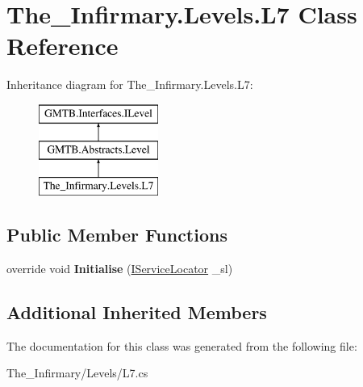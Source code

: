 \hypertarget{class_the___infirmary_1_1_levels_1_1_l7}{}\section{The\+\_\+\+Infirmary.\+Levels.\+L7 Class Reference}
\label{class_the___infirmary_1_1_levels_1_1_l7}
Inheritance diagram for The\+\_\+\+Infirmary.\+Levels.\+L7\+:\begin{figure}[H]
\begin{center}
\leavevmode
\includegraphics[height=3.000000cm]{class_the___infirmary_1_1_levels_1_1_l7}
\end{center}
\end{figure}
\subsection*{Public Member Functions}
\begin{DoxyCompactItemize}
\item 
\mbox{\label{class_the___infirmary_1_1_levels_1_1_l7_a349906e4400cff8ec3688537c7a40f88}} 
override void {\bfseries Initialise} (\mbox{\hyperlink{interface_g_m_t_b_1_1_interfaces_1_1_i_service_locator}{I\+Service\+Locator}} \+\_\+sl)
\end{DoxyCompactItemize}
\subsection*{Additional Inherited Members}


The documentation for this class was generated from the following file\+:\begin{DoxyCompactItemize}
\item 
The\+\_\+\+Infirmary/\+Levels/L7.\+cs\end{DoxyCompactItemize}
